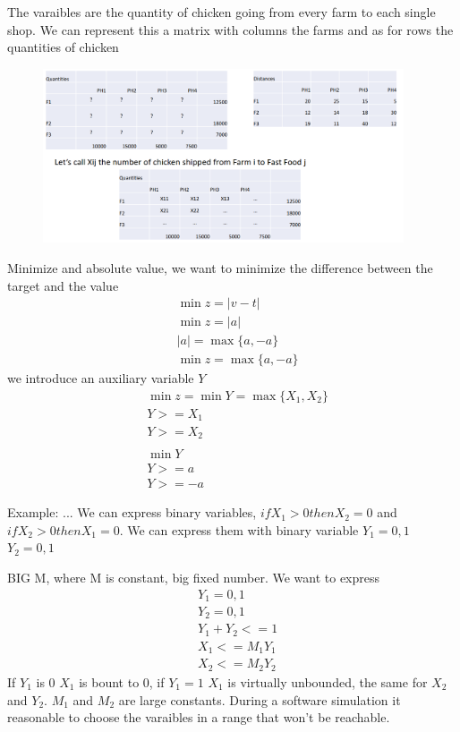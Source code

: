 \documentclass[12pt]{article}
\begin{document}
The varaibles are the quantity of chicken going from every farm to each single shop. We can represent this a matrix with columns the farms and as for rows the quantities of chicken

\begin{figure}
  \begin{center}
    \includegraphics[width=0.95\textwidth]{./img/chichen-farm-variables.png}
  \end{center}
  \caption{}\label{fig:}
\end{figure}


Minimize and absolute value, we want to minimize the difference between the target and the value
\begin{align*}
  & \min{z} = |v - t| \\
  & \min{z} = |a| \\
  & |a| = \max{\{a, -a\}} \\
  & \min{z} = \max{\{a, -a\}} 
\end{align*}
we introduce an auxiliary variable $Y$
\begin{align*}
  & \min{z} = \min{Y} = \max{\{X_1, X_2\}} \\
  & Y >= X_1 \\
  & Y >= X_2 \\
  \\
  & \min{Y} \\
  & Y >= a \\
  & Y >= -a
\end{align*}

Example: 
...
We can express binary variables, $if X_1 > 0 then X_2 = 0$ and $if X_2 > 0 then X_1 = 0$. We can express them with binary variable $Y_1 = 0, 1$ $Y_2 = 0, 1$

BIG M, where M is constant, big fixed number. We want to express
\begin{align*}
  & Y_1 = 0, 1 \\
  & Y_2 = 0, 1 \\ 
  & Y_1 + Y_2 <= 1 \\ 
  & X_1 <= M_1 Y_1 \\ 
  & X_2 <= M_2 Y_2 
\end{align*}
If $Y_1$ is 0 $X_1$ is bount to 0, if $Y_1 = 1$ $X_1$ is virtually unbounded, the same for $X_2$ and $Y_2$. $M_1$ and $M_2$ are large constants. During a software simulation it reasonable to choose the varaibles in a range that won't be reachable.
\end{document}
